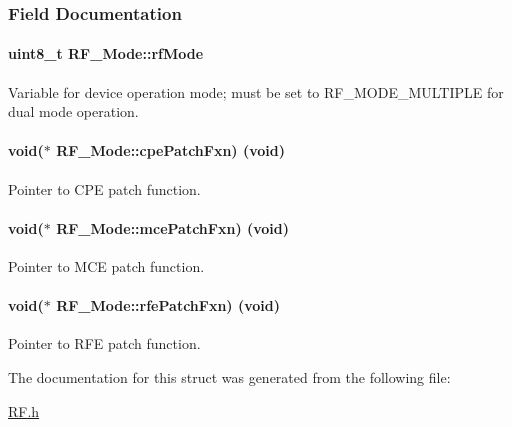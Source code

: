 \subsubsection{Field Documentation}
\paragraph[{rf\+Mode}]{\setlength{\rightskip}{0pt plus 5cm}uint8\+\_\+t R\+F\+\_\+\+Mode\+::rf\+Mode}\label{struct_r_f___mode_a4d6945bf75c2af234159e60ae6ef843a}


Variable for device operation mode; must be set to R\+F\+\_\+\+M\+O\+D\+E\+\_\+\+M\+U\+L\+T\+I\+P\+L\+E for dual mode operation. 

\paragraph[{cpe\+Patch\+Fxn}]{\setlength{\rightskip}{0pt plus 5cm}void($\ast$ R\+F\+\_\+\+Mode\+::cpe\+Patch\+Fxn) (void)}\label{struct_r_f___mode_a2bd4297cca8b9f0fb38aae44d0ae93a5}


Pointer to C\+P\+E patch function. 

\paragraph[{mce\+Patch\+Fxn}]{\setlength{\rightskip}{0pt plus 5cm}void($\ast$ R\+F\+\_\+\+Mode\+::mce\+Patch\+Fxn) (void)}\label{struct_r_f___mode_ae3fe98ef86a6b3e1b0729288c4e8e94a}


Pointer to M\+C\+E patch function. 

\paragraph[{rfe\+Patch\+Fxn}]{\setlength{\rightskip}{0pt plus 5cm}void($\ast$ R\+F\+\_\+\+Mode\+::rfe\+Patch\+Fxn) (void)}\label{struct_r_f___mode_a9ce1fcc0fc102f664127d8f8f21f01b9}


Pointer to R\+F\+E patch function. 



The documentation for this struct was generated from the following file\+:\begin{DoxyCompactItemize}
\item 
\hyperlink{_r_f_8h}{R\+F.\+h}\end{DoxyCompactItemize}
